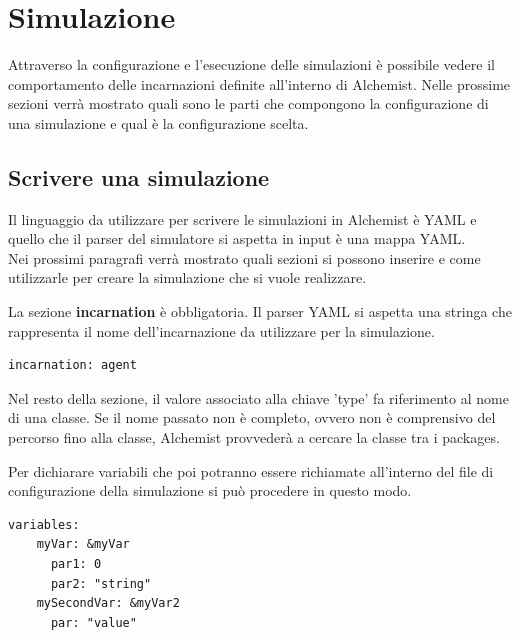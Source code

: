 \documentclass[12pt,a4paper,openright,twoside]{report}
\begin{document}
\section{Simulazione}
Attraverso la configurazione e l'esecuzione delle simulazioni \`e possibile vedere il comportamento delle incarnazioni definite all'interno di Alchemist. Nelle prossime sezioni verr\`a mostrato quali sono le parti che compongono la configurazione di una simulazione e qual \`e la configurazione scelta.

\subsection{Scrivere una simulazione}
Il linguaggio da utilizzare per scrivere le simulazioni in Alchemist \`e YAML e quello che il parser del simulatore si aspetta in input \`e una mappa YAML.
\\
Nei prossimi paragrafi verr\`a mostrato quali sezioni si possono inserire e come utilizzarle per creare la simulazione che si vuole realizzare.

La sezione \textbf{incarnation} \`e obbligatoria. Il parser YAML si aspetta una stringa che rappresenta il nome dell'incarnazione da utilizzare per la simulazione.
\medskip
\begin{lstlisting}[firstnumber=last,caption={Incarnazione}]
  incarnation: agent
\end{lstlisting}

Nel resto della sezione, il valore associato alla chiave 'type' fa riferimento al nome di una classe. Se il nome passato non \`e completo, ovvero non \`e comprensivo del percorso fino alla classe, Alchemist provveder\`a a cercare la classe tra i packages.

Per dichiarare variabili che poi potranno essere richiamate all'interno del file di configurazione della simulazione si pu\`o procedere in questo modo.
\medskip
\begin{lstlisting}[firstnumber=last,caption={Variabili simulazione}]
  variables:
    myVar: &myVar
      par1: 0
      par2: "string"
    mySecondVar: &myVar2
      par: "value"
\end{lstlisting}
\end{document}
